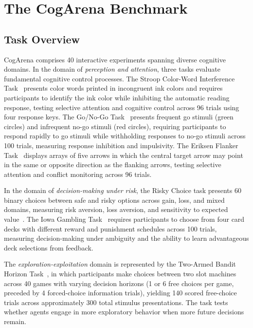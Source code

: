 \documentclass{article}
\begin{document}
\section{The CogArena Benchmark}
\label{sec:benchmark}

\subsection{Task Overview}
\label{sec:tasks}

CogArena comprises 40 interactive experiments spanning diverse cognitive domains. In the domain of \emph{perception and attention}, three tasks evaluate fundamental cognitive control processes. The Stroop Color-Word Interference Task~\citep{stroop1935} presents color words printed in incongruent ink colors and requires participants to identify the ink color while inhibiting the automatic reading response, testing selective attention and cognitive control across 96 trials using four response keys. The Go/No-Go Task~\citep{donders1969reaction, logan1994gonogo} presents frequent go stimuli (green circles) and infrequent no-go stimuli (red circles), requiring participants to respond rapidly to go stimuli while withholding responses to no-go stimuli across 100 trials, measuring response inhibition and impulsivity. The Eriksen Flanker Task~\citep{eriksen1974flanker} displays arrays of five arrows in which the central target arrow may point in the same or opposite direction as the flanking arrows, testing selective attention and conflict monitoring across 96 trials.

In the domain of \emph{decision-making under risk}, the Risky Choice task presents 60 binary choices between safe and risky options across gain, loss, and mixed domains, measuring risk aversion, loss aversion, and sensitivity to expected value~\citep{kahneman1979prospect}. The Iowa Gambling Task~\citep{bechara1994igt} requires participants to choose from four card decks with different reward and punishment schedules across 100 trials, measuring decision-making under ambiguity and the ability to learn advantageous deck selections from feedback.

The \emph{exploration-exploitation} domain is represented by the Two-Armed Bandit Horizon Task~\citep{wilson2014horizon}, in which participants make choices between two slot machines across 40 games with varying decision horizons (1 or 6 free choices per game, preceded by 4 forced-choice information trials), yielding 140 scored free-choice trials across approximately 300 total stimulus presentations. The task tests whether agents engage in more exploratory behavior when more future decisions remain.
\end{document}
